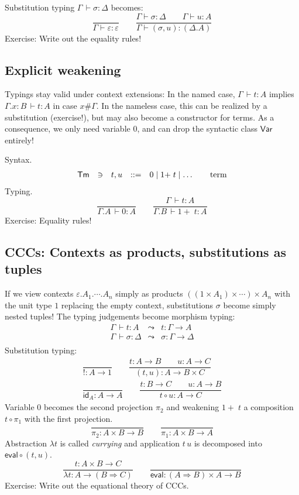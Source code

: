 \documentclass[a4paper,fleqn]{scrartcl}
\newcommand{\tid}{\mathsf{id}}
\newcommand{\comp}{\circ}
\newcommand{\To}{\Rightarrow}
\newcommand{\too}{\longrightarrow}
\newcommand{\teval}{\mathsf{eval}}
\newcommand{\der}{\,\vdash}
\newcommand{\ru}[2]{\dfrac{#1}{#2}}
\newcommand{\Var}{\mathsf{Var}}
\newcommand{\Tm}{\mathsf{Tm}}
\newcommand{\GD}{\ensuremath{\Delta}}
\newcommand{\Ge}{\ensuremath{\varepsilon}}
\newcommand{\Gs}{\ensuremath{\sigma}}
\begin{document}
Substitution typing $\Gamma \der \sigma : \Delta$ becomes:
\[
  \ru{}{\Gamma \vdash \Ge : \Ge}
\qquad
  \ru{\Gamma \vdash \Gs : \GD \qquad \Gamma \vdash u : A
     }{\Gamma \vdash (\Gs,u) : (\GD.A)
     }
\]
Exercise: Write out the equality rules!

\subsection{Explicit weakening}

Typings stay valid under context extensions: In the named case, $\Gamma \der t : A$ implies $\Gamma.x{:}B \der t : A$ in case $x \# \Gamma$.  In the nameless case, this can be realized by a substitution (exercise!), but may also become a constructor for terms.  As a consequence, we only need variable $0$, and can drop the syntactic class $\Var$ entirely!

Syntax.
\[
\begin{array}{lllrl@{\qquad}l}
\Tm & \ni & t,u & ::= & 0 \mid 1{+}\;t \mid \dots & \mbox{term} \\
\end{array}
\]
Typing.
\[
  \ru{}{\Gamma.A \der 0 : A}
\qquad
  \ru{\Gamma \der t : A}{\Gamma.B \der {1+}\; t : A}
\]
Exercise: Equality rules!

\subsection{CCCs: Contexts as products, substitutions as tuples}

If we view contexts $\Ge.A_1.\cdots.A_n$ simply as products
$((1 \times A_1) \times \cdots) \times A_n$ with the unit type $1$
replacing the empty context, substitutions $\Gs$ become simply nested
tuples!  The typing judgements become morphism typing:
\[
\begin{array}{lcl}
  \Gamma \der t : A & \leadsto & t : \Gamma \too A \\
  \Gamma \der \Gs : \Delta & \leadsto & \Gs : \Gamma \too \Delta \\
\end{array}
\]
Substitution typing:
\begin{gather*}
  \ru{}{! : A \to 1}
\qquad
  \ru{t : A \to B \qquad u : A \to C
    }{(t,u) : A \to B \times C}
\\[2ex]
  \ru{}{\tid_A : A \too A}
\qquad
  \ru{t : B \too C \qquad u : A \too B}{t \comp u : A \too C}
\end{gather*}
Variable $0$ becomes the second projection $\pi_2$ and weakening $1{+}\;t$ a composition $t \comp \pi_1$ with the first projection.
\[
  \ru{}{\pi_2 : A \times B \too B}
\qquad
  \ru{}{\pi_1 : A \times B \too A}
\]
Abstraction $\lambda t$ is called \emph{currying} and application $t\,u$ is decomposed into $\teval \comp (t,u)$.
\[
  \ru{t : A \times B \too C}{\lambda t : A \too (B \To C)}
\qquad
  \ru{}{\teval : (A \To B) \times A \too B}
\]
Exercise: Write out the equational theory of CCCs.
\end{document}
